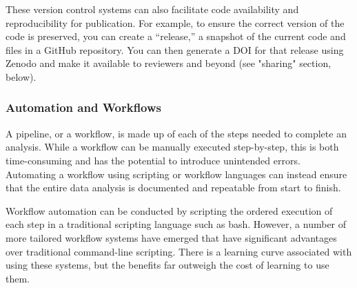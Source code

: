 \documentclass[10pt,letterpaper]{article}
\begin{document}
These version control systems can also facilitate code availability and reproducibility for publication. 
For example, to ensure the correct version of the code is preserved, you can create a “release,” a snapshot of the current code and files in a GitHub repository. 
You can then generate a DOI for that release using Zenodo and make it available to reviewers and beyond (see "sharing" section, below).



\subsubsection*{Automation and Workflows}
A pipeline, or a workflow, is made up of each of the steps needed to complete an analysis.
While a workflow can be manually executed step-by-step, this is both time-consuming and has the potential to introduce unintended errors. 
Automating a workflow using scripting or workflow languages can instead ensure that the entire data analysis is documented and repeatable from start to finish. 

Workflow automation can be conducted by scripting the ordered execution of each step in a traditional scripting language such as bash. 
However, a number of more tailored workflow systems have emerged that have significant advantages over traditional command-line scripting. 
There is a learning curve associated with using these systems, but the benefits far outweigh the cost of learning to use them. 
\end{document}
